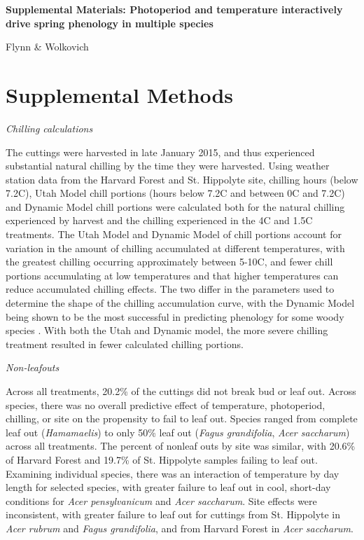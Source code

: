 \documentclass{article}
\begin{document}
\noindent \textbf{\large{Supplemental Materials: Photoperiod and temperature interactively drive spring phenology in multiple species}}

\noindent Flynn \& Wolkovich
\renewcommand{\thetable}{S\arabic{table}}
\renewcommand{\thefigure}{S\arabic{figure}}

\section*{Supplemental Methods}

\noindent\emph{Chilling calculations}

\noindent The cuttings were harvested in late January 2015, and thus experienced substantial natural chilling by the time they were harvested. Using weather station data from the Harvard Forest and St. Hippolyte site, chilling hours (below 7.2\degree C), Utah Model chill portions (hours below 7.2\degree C and between 0\degree C and 7.2\degree C) and Dynamic Model \citep{Erez:1988} chill portions were calculated both for the natural chilling experienced by harvest and the chilling experienced in the 4\degree C and 1.5\degree C treatments. The Utah Model and Dynamic Model of chill portions account for variation in the amount of chilling accumulated at different temperatures, with the greatest chilling occurring approximately between 5-10\degree C, and fewer chill portions accumulating at low temperatures and that higher temperatures can reduce accumulated chilling effects. The two differ in the parameters used to determine the shape of the chilling accumulation curve, with the Dynamic Model being shown to be the most successful in predicting phenology for some woody species \citep{Luedeling:2009}.
With both the Utah and Dynamic model, the more severe chilling treatment resulted in fewer calculated chilling portions. 

\noindent\emph{Non-leafouts}

\noindent Across all treatments, 20.2\% of the cuttings did not break bud or leaf out. Across species, there was no overall predictive effect of temperature, photoperiod, chilling, or site on the propensity to fail to leaf out. Species ranged from complete leaf out (\emph{Hamamaelis}) to only 50\% leaf out (\emph{Fagus grandifolia}, \emph{Acer saccharum}) across all treatments. The percent of nonleaf outs by site was similar, with 20.6\% of Harvard Forest and 19.7\% of St. Hippolyte samples failing to leaf out. Examining individual species,  there was an interaction of temperature by day length for selected species, with greater failure to leaf out in cool, short-day conditions for \emph{Acer pensylvanicum}  and \emph{Acer saccharum}. Site effects were inconsistent, with greater failure to leaf out for cuttings from St. Hippolyte in \emph{Acer rubrum} and \emph{Fagus grandifolia}, and from Harvard Forest in \emph{Acer saccharum}. 
\end{document}

